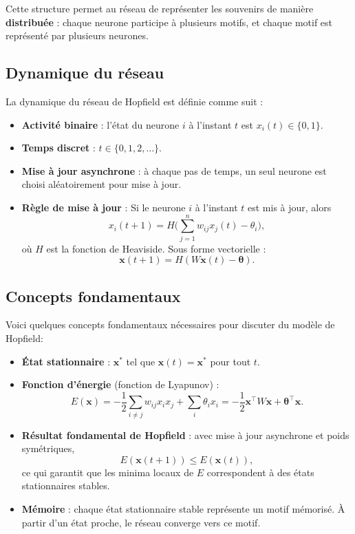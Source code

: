 \documentclass[12pt, letterpaper]{article}
\begin{document}
\begin{tcolorbox}[title=Remarque]
	Cette structure permet au réseau de représenter les souvenirs de manière \textbf{distribuée} : chaque neurone participe à plusieurs motifs, et chaque motif est représenté par plusieurs neurones.
\end{tcolorbox}

\subsection{Dynamique du réseau}\label{subsec:dynamique}

\noindent La dynamique du réseau de Hopfield est définie comme suit :
\begin{itemize}
	\item \textbf{Activité binaire} : l’état du neurone $i$ à l’instant $t$ est $x_i(t) \in \{0,1\}$.
	\item \textbf{Temps discret} : $t \in \{0,1,2,\dots\}$.
	\item \textbf{Mise à jour asynchrone} : à chaque pas de temps, un seul neurone est choisi aléatoirement pour mise à jour.
	\item \textbf{Règle de mise à jour} : Si le neurone $i$ à l'instant $t$ est mis à jour, alors
	      \[
		      x_i(t+1) = H\Bigg(\sum_{j=1}^n w_{ij} x_j(t) - \theta_i \Bigg),
	      \]
	      où $H$ est la fonction de Heaviside.
	      Sous forme vectorielle :
	      \[
		      \mathbf{x}(t+1) = H(W \mathbf{x}(t) - \boldsymbol{\theta}).
	      \]
\end{itemize}

\subsection{Concepts fondamentaux}

Voici quelques concepts fondamentaux nécessaires pour discuter du modèle de Hopfield:
\begin{itemize}
	\item \textbf{État stationnaire} : $\mathbf{x}^*$ tel que $\mathbf{x}(t) = \mathbf{x}^*$ pour tout $t$.
	\item \textbf{Fonction d’énergie} (fonction de Lyapunov) :
	      \[
		      E(\mathbf{x}) = -\frac{1}{2}\sum_{i\neq j} w_{ij}x_ix_j + \sum_i \theta_i x_i = -\frac{1}{2} \mathbf{x}^\top W \mathbf{x} + \boldsymbol{\theta}^\top \mathbf{x}.
	      \]
	\item \textbf{Résultat fondamental de Hopfield} : avec mise à jour asynchrone et poids symétriques,
	      \[
		      E(\mathbf{x}(t+1)) \le E(\mathbf{x}(t)),
	      \]
	      ce qui garantit que les minima locaux de $E$ correspondent à des états stationnaires stables.
	\item \textbf{Mémoire} : chaque état stationnaire stable représente un motif mémorisé. À partir d’un état proche, le réseau converge vers ce motif.
\end{itemize}
\end{document}
